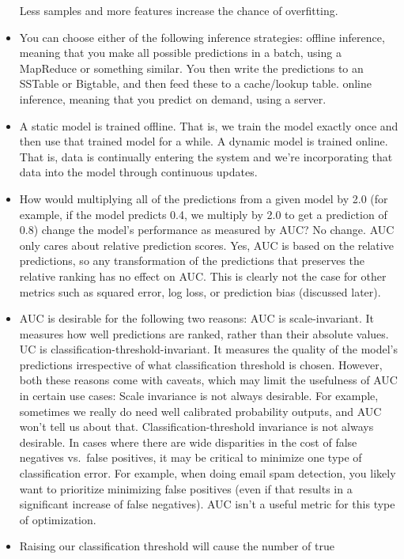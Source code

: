\documentclass[]{book}
\theoremstyle{definition}
\theoremstyle{definition}
\theoremstyle{definition}
\theoremstyle{remark}
\begin{document}
\begin{itemize}
  Less samples and more features increase the chance of overfitting.
\item
  You can choose either of the following inference strategies: offline
  inference, meaning that you make all possible predictions in a batch,
  using a MapReduce or something similar. You then write the predictions
  to an SSTable or Bigtable, and then feed these to a cache/lookup
  table. online inference, meaning that you predict on demand, using a
  server.
\item
  A static model is trained offline. That is, we train the model exactly
  once and then use that trained model for a while. A dynamic model is
  trained online. That is, data is continually entering the system and
  we're incorporating that data into the model through continuous
  updates.
\item
  How would multiplying all of the predictions from a given model by 2.0
  (for example, if the model predicts 0.4, we multiply by 2.0 to get a
  prediction of 0.8) change the model's performance as measured by AUC?
  No change. AUC only cares about relative prediction scores. Yes, AUC
  is based on the relative predictions, so any transformation of the
  predictions that preserves the relative ranking has no effect on AUC.
  This is clearly not the case for other metrics such as squared error,
  log loss, or prediction bias (discussed later).
\item
  AUC is desirable for the following two reasons: AUC is
  scale-invariant. It measures how well predictions are ranked, rather
  than their absolute values. UC is classification-threshold-invariant.
  It measures the quality of the model's predictions irrespective of
  what classification threshold is chosen. However, both these reasons
  come with caveats, which may limit the usefulness of AUC in certain
  use cases: Scale invariance is not always desirable. For example,
  sometimes we really do need well calibrated probability outputs, and
  AUC won't tell us about that. Classification-threshold invariance is
  not always desirable. In cases where there are wide disparities in the
  cost of false negatives vs.~false positives, it may be critical to
  minimize one type of classification error. For example, when doing
  email spam detection, you likely want to prioritize minimizing false
  positives (even if that results in a significant increase of false
  negatives). AUC isn't a useful metric for this type of optimization.
\item
  Raising our classification threshold will cause the number of true

\end{itemize}
\end{document}
